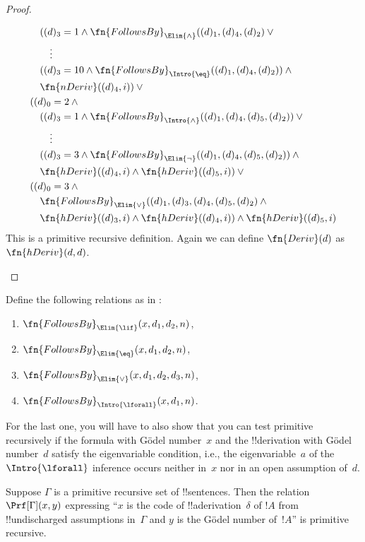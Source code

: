 \documentclass[../../../include/open-logic-section]{subfiles}
\begin{document}
\begin{proof}
\begin{enumerate}
\begin{multline*}
\begin{aligned}
& \quad ((d)_3 = 1 \land
\fn{FollowsBy}_{\Elim{\land}}((d)_1, (d)_4, (d)_2) \lor{}\\
& \qquad \vdots\\
& \quad ((d)_3 = 10 \land
\fn{FollowsBy}_{\Intro{\eq}}((d)_1, (d)_4, (d)_2)) \land {}\\
& \quad \fn{nDeriv}((d)_4, i)) \lor {}\\
& ((d)_0 = 2 \land {}\\
& \quad ((d)_3 = 1 \land 
\fn{FollowsBy}_{\Intro{\land}}((d)_1, (d)_4, (d)_5, (d)_2)) \lor{}\\
& \qquad \vdots\\
& \quad ((d)_3 = 3 \land
\fn{FollowsBy}_{\Elim{\lnot}}((d)_1, (d)_4, (d)_5, (d)_2)) \land {}\\
& \quad \fn{hDeriv}((d)_4, i) \land \fn{hDeriv}((d)_5, i)) \lor {}\\
& ((d)_0 = 3 \land {}\\
& \quad \fn{FollowsBy}_{\Elim{\lor}}((d)_1, (d)_3, (d)_4, (d)_5, (d)_2) \land{}\\
& \quad \fn{hDeriv}((d)_3, i) \land \fn{hDeriv}((d)_4, i)) \land \fn{hDeriv}((d)_5, i)  
  \end{aligned}
  \end{multline*}
This is a primitive recursive definition. Again we can define
$\fn{Deriv}(d)$ as $\fn{hDeriv}(d, d)$.
\end{enumerate}
\end{proof}

\begin{prob}
Define the following relations as in
:
\begin{enumerate}
\item $\fn{FollowsBy}_{\Elim{\lif}}(x, d_1, d_2, n)$,
\item $\fn{FollowsBy}_{\Elim{\eq}}(x, d_1, d_2, n)$,
\item $\fn{FollowsBy}_{\Elim{\lor}}(x, d_1, d_2, d_3, n)$,
\item $\fn{FollowsBy}_{\Intro{\lforall}}(x, d_1, n)$.
\end{enumerate}
For the last one, you will have to also show that you can test
primitive recursively if the formula with G\"odel number~$x$ and the
!!{derivation} with G\"odel number~$d$ satisfy the eigenvariable
condition, i.e., the eigenvariable~$a$ of the $\Intro{\lforall}$
inference occurs neither in~$x$ nor in an open assumption of~$d$.
\end{prob}

\begin{prop}
Suppose $\Gamma$ is a primitive recursive set of !!{sentence}s.  Then
the relation $\Prf[\Gamma](x, y)$ expressing ``$x$ is the code of
!!a{derivation}~$\delta$ of $!A$ from !!{undischarged} assumptions
in~$\Gamma$ and $y$ is the G\"odel number of~$!A$'' is primitive
recursive.
\end{prop}
\end{document}

